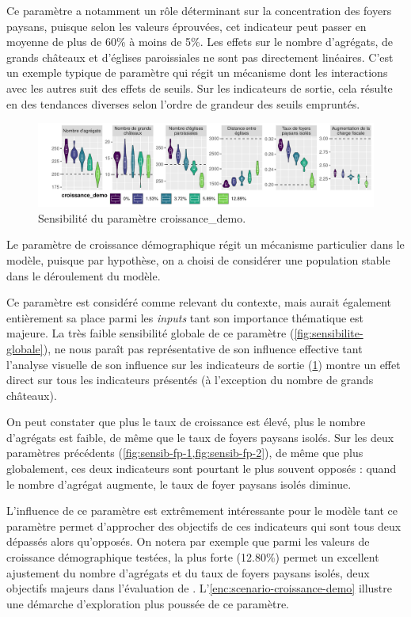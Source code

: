 Ce paramètre a notamment un rôle déterminant sur la concentration des foyers paysans, puisque selon les valeurs éprouvées, cet indicateur peut passer en moyenne de plus de 60\% à moins de 5\%.
Les effets sur le nombre d'agrégats, de grands châteaux et d'églises paroissiales ne sont pas directement linéaires.
C'est un exemple typique de paramètre qui régit un mécanisme dont les interactions avec les autres suit des effets de seuils.
Sur les indicateurs de sortie, cela résulte en des tendances diverses selon l'ordre de grandeur des seuils empruntés.

\begin{figure}[H]
	\centering
	\includegraphics[width=\linewidth]{img/sensib/sensibilite_croissance_demo.pdf}
	\caption{Sensibilité du paramètre \textsf{croissance\_demo}.}
	\label{fig:sensib-fp-3}
\end{figure}

Le paramètre de croissance démographique régit un mécanisme particulier dans le modèle, puisque par hypothèse, on a choisi de considérer une population stable dans le déroulement du modèle.

Ce paramètre est considéré comme relevant du contexte, mais aurait également entièrement sa place parmi les \textit{inputs} tant son importance thématique est majeure.
La très faible sensibilité globale de ce paramètre (\cref{fig:sensibilite-globale}), ne nous paraît pas représentative de son influence effective tant l'analyse visuelle de son influence sur les indicateurs de sortie (\cref{fig:sensib-fp-3}) montre un effet direct sur tous les indicateurs présentés (à l'exception du nombre de grands châteaux).

On peut constater que plus le taux de croissance est élevé, plus le nombre d'agrégats est faible, de même que le taux de foyers paysans isolés.
Sur les deux paramètres précédents (\cref{fig:sensib-fp-1,fig:sensib-fp-2}), de même que plus globalement, ces deux indicateurs sont pourtant le plus souvent opposés : quand le nombre d'agrégat augmente, le taux de foyer paysans isolés diminue.

L'influence de ce paramètre est extrêmement intéressante pour le modèle tant ce paramètre permet d'approcher des objectifs de ces indicateurs qui sont tous deux dépassés alors qu'opposés.
On notera par exemple que parmi les valeurs de croissance démographique testées, la plus forte (12.80\%) permet un excellent ajustement du nombre d'agrégats et du taux de foyers paysans isolés, deux objectifs majeurs dans l'évaluation de \simfeodal{}.
L'\cref{enc:scenario-croissance-demo} illustre une démarche d'exploration plus poussée de ce paramètre.


